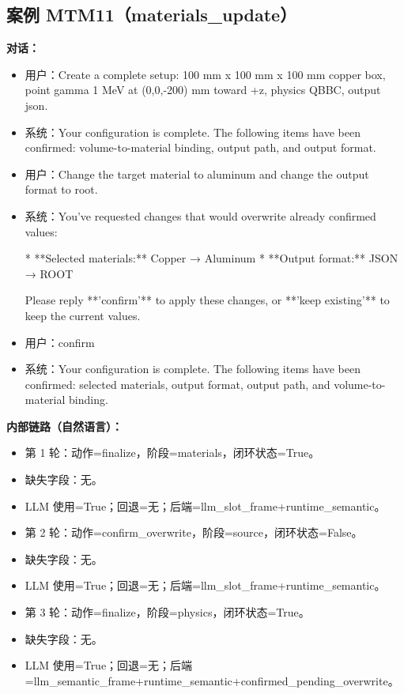\documentclass[11pt]{ctexart}
\begin{document}
\subsection{案例 MTM11（materials\_update）}
\textbf{对话：}
\begin{itemize}
\item 用户：Create a complete setup: 100 mm x 100 mm x 100 mm copper box, point gamma 1 MeV at (0,0,-200) mm toward +z, physics QBBC, output json.
\item 系统：Your configuration is complete. The following items have been confirmed: volume-to-material binding, output path, and output format.
\item 用户：Change the target material to aluminum and change the output format to root.
\item 系统：You've requested changes that would overwrite already confirmed values:

*   **Selected materials:** Copper → Aluminum
*   **Output format:** JSON → ROOT

Please reply **'confirm'** to apply these changes, or **'keep existing'** to keep the current values.
\item 用户：confirm
\item 系统：Your configuration is complete. The following items have been confirmed: selected materials, output format, output path, and volume-to-material binding.
\end{itemize}
\textbf{内部链路（自然语言）：}
\begin{itemize}
\item 第 1 轮：动作=finalize，阶段=materials，闭环状态=True。
\item 缺失字段：无。
\item LLM 使用=True；回退=无；后端=llm\_slot\_frame+runtime\_semantic。
\item 第 2 轮：动作=confirm\_overwrite，阶段=source，闭环状态=False。
\item 缺失字段：无。
\item LLM 使用=True；回退=无；后端=llm\_slot\_frame+runtime\_semantic。
\item 第 3 轮：动作=finalize，阶段=physics，闭环状态=True。
\item 缺失字段：无。
\item LLM 使用=True；回退=无；后端=llm\_semantic\_frame+runtime\_semantic+confirmed\_pending\_overwrite。
\end{itemize}
\end{document}
